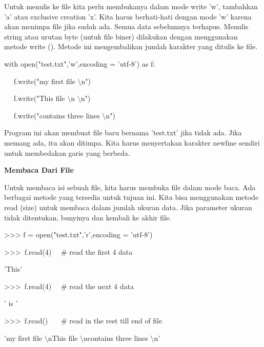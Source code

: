 Untuk menulis ke file kita perlu membukanya dalam mode write 'w', tambahkan 'a' atau exclusive creation 'x'. Kita harus berhati-hati dengan mode 'w' karena akan menimpa file jika sudah ada. Semua data sebelumnya terhapus. Menulis string atau urutan byte (untuk file biner) dilakukan dengan menggunakan metode write (). Metode ini mengembalikan jumlah karakter yang ditulis ke file. \par
\vspace{12pt}
\noindent 
with open("test.txt",'w',encoding = 'utf-8') as f: \par
\noindent 
~~ f.write("my first file $  \setminus  $n") \par
\noindent 
~~ f.write("This file $  \setminus  $n $  \setminus  $n") \par
\noindent 
~~ f.write("contains three lines $  \setminus  $n") \par
\vspace{12pt}
Program ini akan membuat file baru bernama 'test.txt' jika tidak ada. Jika memang ada, itu akan ditimpa. Kita harus menyertakan karakter newline sendiri untuk membedakan garis yang berbeda. \par
\vspace{12pt}
\noindent 
{\fontsize{14pt}{14pt}\selectfont \textbf{Membaca Dari File} \\} \par
\vspace{12pt}
Untuk membaca isi sebuah file, kita harus membuka file dalam mode baca. Ada berbagai metode yang tersedia untuk tujuan ini. Kita bisa menggunakan metode read (size) untuk membaca dalam jumlah ukuran data. Jika parameter ukuran tidak ditentukan, bunyinya dan kembali ke akhir file. \par
\vspace{12pt}
\vspace{12pt}
\noindent 
>>> f = open("test.txt",'r',encoding = 'utf-8') \par
\noindent 
>>>~f.read(4)~~   $  \#  $ read the first 4 data \par
\noindent 
'This' \par
\vspace{12pt}
\noindent 
>>>~f.read(4)~~   $  \#  $ read the next 4 data \par
\noindent 
' is ' \par
\vspace{12pt}
\noindent 
>>>~f.read()~~~   $  \#  $ read in the rest till end of file \par
\noindent 
'my first file $  \setminus  $nThis file $  \setminus  $ncontains three lines $  \setminus  $n' \par
